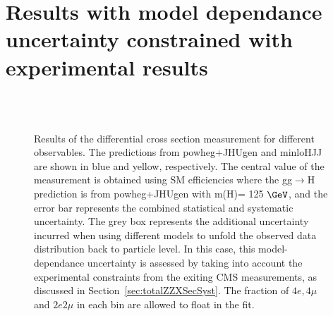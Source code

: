 \section{Results with model dependance uncertainty constrained with experimental results}

\begin{figure}[!h!tb]
  \begin{center}

     \\
     \\
    \caption{Results of the differential cross section measurement for different observables. The predictions from {\sc powheg+JHUgen} and {\sc minloHJJ} are shown in blue and yellow, respectively. The central value of the measurement is obtained using SM efficiencies where the gg$\rightarrow$H prediction is from {\sc powheg+JHUgen} with m(H)= 125 $\GeV$, and the error bar represents the combined statistical and systematic uncertainty. The grey box represents the additional uncertainty incurred when using different models to unfold the observed data distribution back to particle level. In this case, this model-dependance uncertainty is assessed by taking into account the experimental constraints from the exiting CMS measurements, as discussed in Section~\ref{sec:totalZZXSecSyst}. The fraction of $4e,4\mu$ and $2e2\mu$ in each bin are allowed to float in the fit.
    }
  \label{fig:differential-results-restrictive_md}
 \end{center}
\end{figure}
